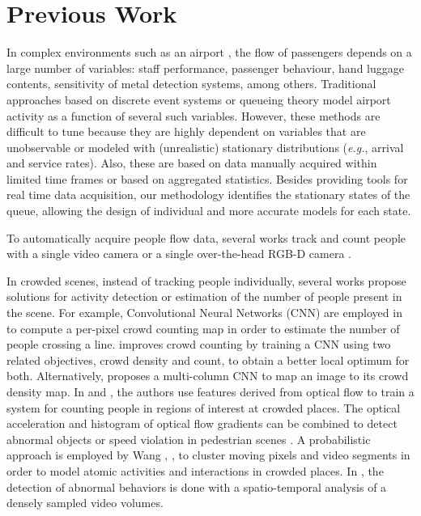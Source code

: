 \section{Previous Work}
\label{sec:related-work}

In complex environments such as an airport \cite{wu2013review}, the flow of passengers depends on a large number of variables: staff performance, passenger behaviour, hand luggage contents, sensitivity of metal detection systems, among others. 
Traditional approaches based on discrete event systems \cite{guizzi2009discrete,dorton2016effects} or queueing theory \cite{gilliam1979application,takakuwa2003modeling,de2013virtual} model airport activity as a function of several such variables. 
However, these methods are difficult to tune because they are highly dependent on variables that are unobservable or modeled with (unrealistic) stationary distributions (\emph{e.g.}, arrival and service rates). Also, these are based on data manually acquired within limited time frames or based on aggregated statistics.
Besides providing tools for real time data acquisition, our methodology identifies the stationary states of the queue, allowing the design of individual and more accurate models for each state.

To automatically acquire people flow data, several works track and count people with a single video camera \cite{albiol2009statistical,barandiaran2008real} or a single over-the-head RGB-D camera \cite{gao2016people,del2015versatile,fu2014scene}. 

In crowded scenes, instead of tracking people individually, several works propose solutions for activity detection or estimation of the number of people present in the scene.
For example, Convolutional Neural Networks (CNN) are employed in \cite{zhao2016crossing} to compute a per-pixel crowd counting map in order to estimate the number of people crossing a line.  
\cite{zhang2015cross} improves crowd counting by training a CNN using two related objectives, crowd density and count, to obtain a better local optimum for both.
Alternatively, \cite{zhang2016single} proposes a multi-column CNN to map an image to its crowd density map.
In \cite{ma2013crossing} and \cite{mukherjee2015unique}, the authors use features derived from optical flow to train a system for counting people in regions of interest at crowded places. 
The optical acceleration and histogram of optical flow gradients can be combined to detect abnormal objects or speed violation in pedestrian scenes \cite{nallaivarothayan2014mrf}.
A probabilistic approach is employed by Wang \etal, \cite{wang2009unsupervised}, to cluster moving pixels and video segments in order to model atomic activities and interactions in crowded places.
In \cite{roshtkhari2013online}, the detection of abnormal behaviors is done with a spatio-temporal analysis of a densely sampled video volumes.

